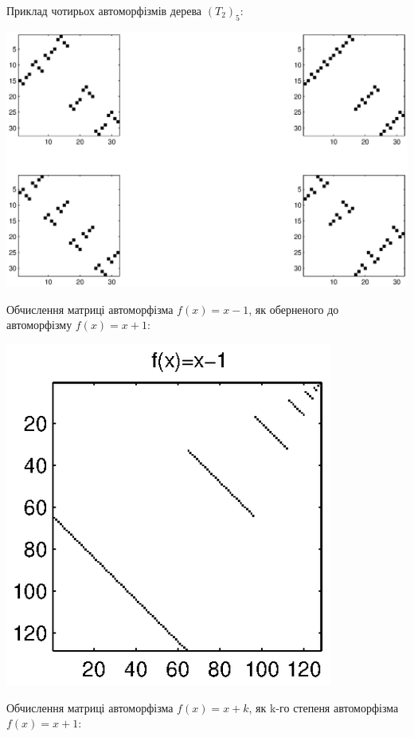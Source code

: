 \documentclass[a4paper,12pt]{article} \usepackage{a4wide}
\numberwithin{equation}{subsection}
\begin{document}
   Приклад чотирьох  автоморфізмів дерева $(T_2)_5$:
   \begin{center}
\includegraphics[scale=0.5]{4randm.eps}

\end{center}

Обчислення матриці автоморфізма $f(x)=x-1$, як оберненого до
автоморфізму $f(x)=x+1$:

\begin{center}
\includegraphics[scale=1.]{mat_x-1.eps}
\end{center}
Обчислення матриці автоморфізма $f(x)=x+k$, як k-го степеня автоморфізма $f(x)=x+1$:
\end{document}
